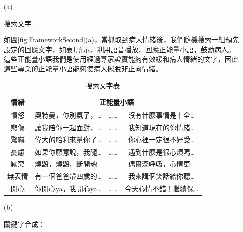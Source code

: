 \documentclass[12pt]{scrreprt}
\begin{document}
\begin{itemize}
\vspace{-0.5cm}
\begin{itemize}
\item[(a)]{\begin{bfseries}{搜索文字：}\end{bfseries}}

如圖\ref{fig:FrameworkSecond}(a)，當抓取到病人情緒後，我們隨機搜索一組預先設定的回應文字，如表\ref{lab:searchtext}所示，利用語音播放，回應正能量小語，鼓勵病人。這些正能量小語我們是使用經過專家證實能夠有效緩和病人情緒的文字，因此這些專業的正能量小語能夠使病人擺脫非正向情緒。

\renewcommand{\arraystretch}{0.9} 
\renewcommand{\multirowsetup}{\centering}

\vspace{-0.5cm}
\begin{table}[h]
\caption{搜索文字表}
    \centering
\begin{tabular}{|*{4}{r|}}
\hline
\multicolumn{1}{|c|}{情緒}
& \multicolumn{3}{c|}{正能量小語} \\\hline
\multicolumn{1}{|c}{憤怒}&\multicolumn{1}{|c}{奧特曼，你別氣了，…}&\multicolumn{1}{|c}{……}&\multicolumn{1}{|c|}{沒有什麼事情是十全…} \\\hline
\multicolumn{1}{|c}{悲傷}&\multicolumn{1}{|c}{讓我陪你一起面對，…}&\multicolumn{1}{|c}{……}&\multicolumn{1}{|c|}{我知道現在的你情緒…} \\\hline
\multicolumn{1}{|c}{驚嚇}&\multicolumn{1}{|c}{偉大的哈利來幫你了…}&\multicolumn{1}{|c}{……}&\multicolumn{1}{|c|}{你心裡一定很不好受…}\\\hline
\multicolumn{1}{|c}{憂慮}&\multicolumn{1}{|c}{如果你願意說，我隨…}&\multicolumn{1}{|c}{……}&\multicolumn{1}{|c|}{遇到什麼是很心煩嗎…}\\\hline
\multicolumn{1}{|c}{厭惡}&\multicolumn{1}{|c}{燒毀，燒毀，斷開魂…}   &\multicolumn{1}{|c}{……}   &\multicolumn{1}{|c|}{偶爾深呼吸，心情更… }\\\hline
\multicolumn{1}{|c}{無表情}&\multicolumn{1}{|c}{有一個爸爸帶四歲的…}   &\multicolumn{1}{|c}{……}   &\multicolumn{1}{|c|}{我來講個笑話給你聽…}\\\hline
\multicolumn{1}{|c}{開心}&\multicolumn{1}{|c}{你開心ya，我開心ya…}   &\multicolumn{1}{|c}{……}   &\multicolumn{1}{|c|}{今天心情不錯！繼續保…}\\\hline
\end{tabular}
\label{lab:searchtext}
\end{table}

\item[(b)]{\begin{bfseries}{關鍵字合成：}\end{bfseries}}


\end{itemize}
\end{itemize}
\end{document}
